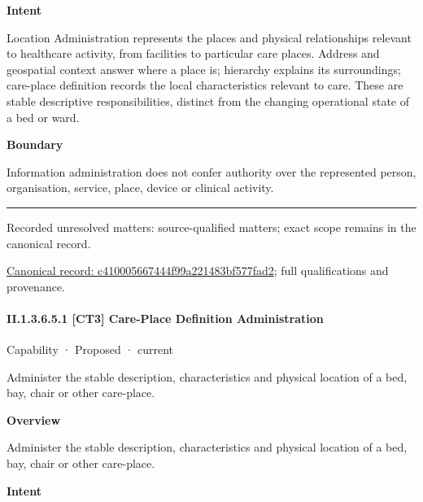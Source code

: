 \textbf{Intent}



Location Administration represents the places and physical relationships relevant to healthcare activity, from facilities to particular care places. Address and geospatial context answer where a place is; hierarchy explains its surroundings; care-place definition records the local characteristics relevant to care. These are stable descriptive responsibilities, distinct from the changing operational state of a bed or ward.



\textbf{Boundary}



Information administration does not confer authority over the represented person, organisation, service, place, device or clinical activity.



\medskip\hrule\medskip

{\small Recorded unresolved matters: source-qualified matters; exact scope remains in the canonical record.}\par
{\footnotesize \href{../../../../continuum/strategy/capability/c410005667444f99a221483bf577fad2.md}{Canonical record: c410005667444f99a221483bf577fad2}; full qualifications and provenance.}\par
\paragraph*{II.1.3.6.5.1 [CT3] Care-Place Definition Administration}
\label{navigation:II.1.3.6.5.1}

\label{element:629b493c7d9844baa25c029a87ed04f6}
{\small Capability · Proposed · current}\par

Administer the stable description, characteristics and physical location of a bed, bay, chair or other care-place.



\textbf{Overview}



Administer the stable description, characteristics and physical location of a bed, bay, chair or other care-place.



\textbf{Intent}



